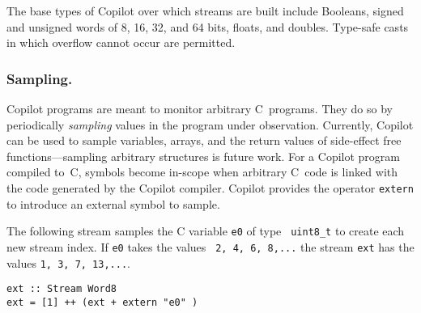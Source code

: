 %
%
The base types of Copilot over which streams are built include Booleans, signed
and unsigned words of 8, 16, 32, and 64 bits, floats, and doubles. Type-safe
casts in which overflow cannot occur are permitted.

\subsubsection{Sampling.}
Copilot programs are meant to monitor arbitrary C~programs.  They do
so by
periodically \emph{sampling} values in the program under observation.   Currently, Copilot can
be used to  sample variables, arrays,
and the return values of side-effect free functions---sampling arbitrary
structures is future work.  For a Copilot program compiled to~C, symbols become
in-scope when arbitrary C~code is linked with the code generated by the Copilot
compiler.  Copilot provides the operator {\tt extern} to introduce an external
symbol to sample.  %




The following stream samples the C variable {\tt e0} of type {\tt
  uint8\_t} to create each new stream index.  If {\tt e0} takes the values {\tt
 2, 4, 6, 8,...}  the stream {\tt ext} has the values {\tt 1, 3, 7, 13,...}.

\begin{lstlisting}[frame=single]
ext :: Stream Word8
ext = [1] ++ (ext + extern "e0" )
\end{lstlisting}
%

%
% 

